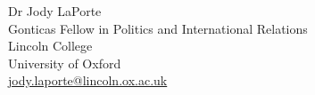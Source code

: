 \documentclass[11pt, a4paper]{article}
\begin{document}
\bigskip

\noindent
\begin{minipage}[t]{0.47\textwidth}\raggedright
    Dr Jody LaPorte\\
    Gonticas Fellow in Politics and International Relations\\
    Lincoln College\\
    University of Oxford\\
    \url{jody.laporte@lincoln.ox.ac.uk}
  \end{minipage}
\end{document}
